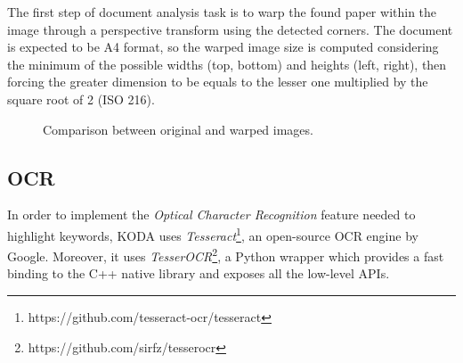 \documentclass[a4paper]{article}
\begin{document}
The first step of document analysis task is to warp the found paper within the image through a perspective transform using the detected corners. The document is expected to be A4 format, so the warped image size is computed considering the minimum of the possible widths (top, bottom) and heights (left, right), then forcing the greater dimension to be equals to the lesser one multiplied by the square root of 2 (ISO 216).

\begin{figure}[H]
	\caption{Comparison between original and warped images.}
	\label{fig:warping}
\end{figure}

\subsection{OCR}

In order to implement the \textit{Optical Character Recognition} feature needed to highlight keywords, KODA uses \textit{Tesseract}\footnote{https://github.com/tesseract-ocr/tesseract}, an open-source OCR engine by Google. Moreover, it uses \textit{TesserOCR}\footnote{https://github.com/sirfz/tesserocr}, a Python wrapper which provides a fast binding to the C++ native library and exposes all the low-level APIs.
\end{document}
